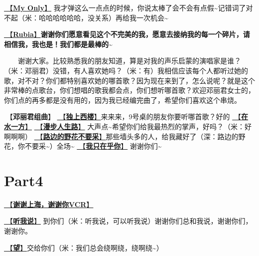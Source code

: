 \documentclass[]{ctexbook}
\begin{document}
\hyperref[my-only]{🎵【\textbf{My Only}】} 我才弹这么一点点的时候，你说太棒了会不会有点假\textasciitilde 记错词了对不起（米：哈哈哈哈哈哈，没关系）再给我一次机会\textasciitilde{}

\hyperref[rubia]{🎵【\textbf{Rubia}】}\textbf{谢谢你们愿意看见这个不完美的我，愿意去接纳我的每一个碎片，请相信我，我也是！我们都是最棒的\textasciitilde{}}

  谢谢大家。比较熟悉我的朋友知道，算是对我的声乐启蒙的演唱家是谁？（米：邓丽君）没错，有人喜欢她吗？（米：有）我相信应该每个人都听过她的歌，对不对？你们都特别喜欢她的哪首歌？因为现在来到了，怎么说呢？就是这个非常棒的点歌台，你们想唱的歌我都会点，你们想听哪首歌？欢迎邓丽君女士的，你们点的再多都是没有用的，因为我已经编完曲了，希望你们喜欢这个串烧。

🎵【\textbf{邓丽君组曲}】
\hyperref[one-in-the-building]{🎵【\textbf{独上西楼}】}来来来，9号桌的朋友你要听哪首歌？好的
\hyperref[on-the-water-side]{🎵【\textbf{在水一方}】}
\hyperref[walk-the-road-of-life]{🎵【\textbf{漫步人生路}】} 大声点\textasciitilde 希望你们给我最热烈的掌声，好吗？（米：好啊啊啊）
\hyperref[only-with-me]{🎵【\textbf{路边的野花不要采}】}那些墙头多的人，给我藏好了（深：路边的野花，你不要采\textasciitilde）全场\textasciitilde{}
\hyperref[only-you]{🎵【\textbf{我只在乎你}】} 谢谢你们\textasciitilde{}

\section{Part4}\label{shanghai-20240519-part4}

\hyperref[thank-you-vcr]{🎥【\textbf{谢谢上海，谢谢你VCR}】}

\hyperref[listen-to-me]{🎵【\textbf{听我说}】} 到你们（米：听我说，可以听我说）谢谢你们总和我说，谢谢你们，谢谢你。

\hyperref[hope]{🎵【\textbf{望}】}交给你们（米：我们总会绕啊绕，绕啊绕\textasciitilde）
\end{document}
